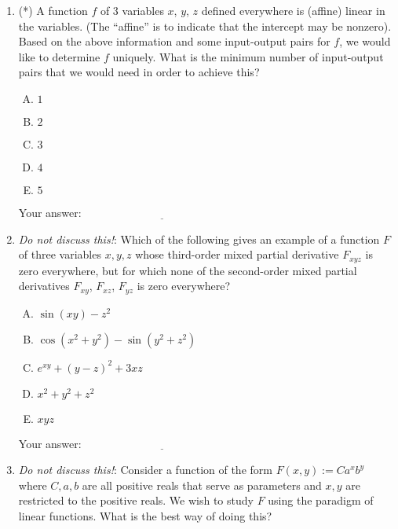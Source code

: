 \documentclass[10pt]{amsart}
\begin{document}
\begin{enumerate}
\item (*) A function $f$ of $3$ variables $x$, $y$, $z$ defined
  everywhere is (affine) linear in the variables. (The ``affine'' is
  to indicate that the intercept may be nonzero). Based on the above
  information and some input-output pairs for $f$, we would like to
  determine $f$ uniquely. What is the minimum number of input-output
  pairs that we would need in order to achieve this?

  \begin{enumerate}[(A)]
  \item $1$
  \item $2$
  \item $3$
  \item $4$
  \item $5$
  \end{enumerate}

  \vspace{0.1in}
  Your answer: $\underline{\qquad\qquad\qquad\qquad\qquad\qquad\qquad}$
  \vspace{0.6in}

\item {\em Do not discuss this!}: Which of the following gives an
  example of a function $F$ of three variables $x,y,z$ whose
  third-order mixed partial derivative $F_{xyz}$ is zero everywhere,
  but for which none of the second-order mixed partial derivatives
  $F_{xy}$, $F_{xz}$, $F_{yz}$ is zero everywhere?

  \begin{enumerate}[(A)]
  \item $\sin(xy) - z^2$
  \item $\cos(x^2 + y^2) - \sin(y^2 + z^2)$
  \item $e^{xy} + (y - z)^2 + 3xz$
  \item $x^2 + y^2 + z^2$
  \item $xyz$
  \end{enumerate}

  \vspace{0.1in}
  Your answer: $\underline{\qquad\qquad\qquad\qquad\qquad\qquad\qquad}$
  \vspace{0.6in}

\item {\em Do not discuss this!}: Consider a function of the form
  $F(x,y) := Ca^xb^y$ where $C,a,b$ are all positive reals that serve
  as parameters and $x,y$ are restricted to the positive reals. We
  wish to study $F$ using the paradigm of linear functions. What is
  the best way of doing this?


\end{enumerate}
\end{document}
